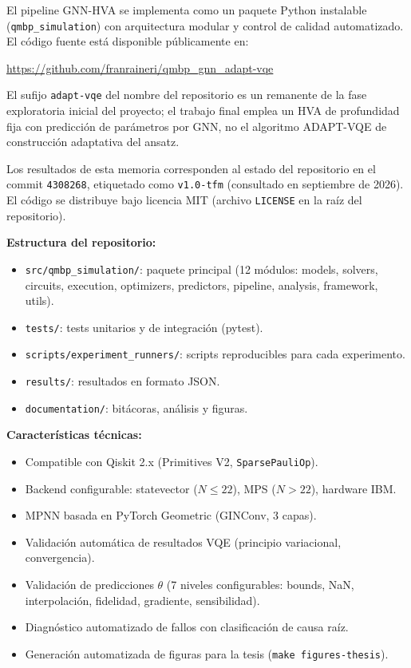 \documentclass[11pt,a4paper,spanish]{book}
\begin{document}
El pipeline GNN-HVA se implementa como un paquete Python instalable (\texttt{qmbp\_simulation}) con arquitectura modular y control de calidad automatizado. El código fuente está disponible públicamente en:

\begin{center}
\url{https://github.com/franraineri/qmbp_gnn_adapt-vqe}
\end{center}

El sufijo \texttt{adapt-vqe} del nombre del repositorio es un remanente de la fase exploratoria inicial del proyecto; el trabajo final emplea un HVA de profundidad fija con predicción de parámetros por GNN, no el algoritmo ADAPT-VQE de construcción adaptativa del ansatz.

Los resultados de esta memoria corresponden al estado del repositorio en el commit \texttt{4308268}, etiquetado como \texttt{v1.0-tfm} (consultado en septiembre de 2026). El código se distribuye bajo licencia MIT (archivo \texttt{LICENSE} en la raíz del repositorio).

\textbf{Estructura del repositorio:}
\begin{itemize}
    \item \texttt{src/qmbp\_simulation/}: paquete principal (12 módulos: models, solvers, circuits, execution, optimizers, predictors, pipeline, analysis, framework, utils).
    \item \texttt{tests/}: tests unitarios y de integración (pytest).
    \item \texttt{scripts/experiment\_runners/}: scripts reproducibles para cada experimento.
    \item \texttt{results/}: resultados en formato JSON.
    \item \texttt{documentation/}: bitácoras, análisis y figuras.
\end{itemize}

\textbf{Características técnicas:}
\begin{itemize}
    \item Compatible con Qiskit 2.x (Primitives V2, \texttt{SparsePauliOp}).
    \item Backend configurable: statevector ($N \leq 22$), MPS ($N > 22$), hardware IBM.
    \item MPNN basada en PyTorch Geometric \citep{fey2019} (GINConv, 3 capas).
    \item Validación automática de resultados VQE (principio variacional, convergencia).
    \item Validación de predicciones $\theta$ (7 niveles configurables: bounds, NaN, interpolación, fidelidad, gradiente, sensibilidad).
    \item Diagnóstico automatizado de fallos con clasificación de causa raíz.
    \item Generación automatizada de figuras para la tesis (\texttt{make figures-thesis}).
\end{itemize}
\end{document}
